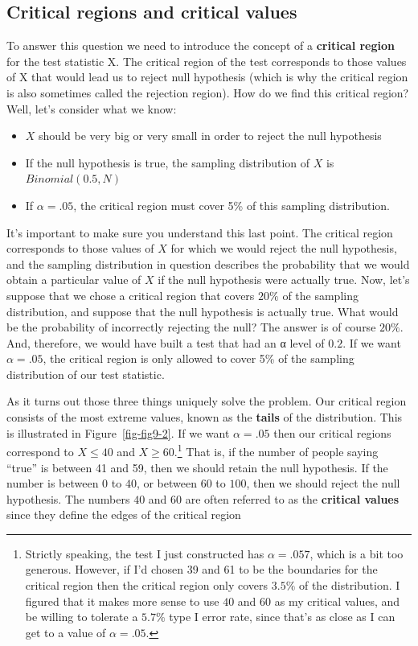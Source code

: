 \documentclass[
  a4paper,
]{book}
\providecommand{\tightlist}{%
  \setlength{\itemsep}{0pt}\setlength{\parskip}{0pt}}\usepackage{longtable,booktabs,array}
\begin{document}
\hypertarget{critical-regions-and-critical-values}{%
\subsection{Critical regions and critical
values}\label{critical-regions-and-critical-values}}

To answer this question we need to introduce the concept of a
\textbf{critical region} for the test statistic X. The critical region
of the test corresponds to those values of X that would lead us to
reject null hypothesis (which is why the critical region is also
sometimes called the rejection region). How do we find this critical
region? Well, let's consider what we know:

\begin{itemize}
\tightlist
\item
  \(X\) should be very big or very small in order to reject the null
  hypothesis
\item
  If the null hypothesis is true, the sampling distribution of \(X\) is
  \(Binomial(0.5, N)\)
\item
  If \(\alpha = .05\), the critical region must cover 5\% of this
  sampling distribution.
\end{itemize}

It's important to make sure you understand this last point. The critical
region corresponds to those values of \(X\) for which we would reject
the null hypothesis, and the sampling distribution in question describes
the probability that we would obtain a particular value of \(X\) if the
null hypothesis were actually true. Now, let's suppose that we chose a
critical region that covers \(20\%\) of the sampling distribution, and
suppose that the null hypothesis is actually true. What would be the
probability of incorrectly rejecting the null? The answer is of course
\(20\%\). And, therefore, we would have built a test that had an α level
of \(0.2\). If we want \(\alpha = .05\), the critical region is only
allowed to cover 5\% of the sampling distribution of our test statistic.

As it turns out those three things uniquely solve the problem. Our
critical region consists of the most extreme values, known as the
\textbf{tails} of the distribution. This is illustrated in
Figure~\ref{fig-fig9-2}. If we want \(\alpha = .05\) then our critical
regions correspond to \(X \leq 40\) and \(X \geq 60\).\footnote{Strictly
  speaking, the test I just constructed has \(\alpha = .057\), which is
  a bit too generous. However, if I'd chosen 39 and 61 to be the
  boundaries for the critical region then the critical region only
  covers \(3.5\%\) of the distribution. I figured that it makes more
  sense to use \(40\) and \(60\) as my critical values, and be willing
  to tolerate a \(5.7\%\) type I error rate, since that's as close as I
  can get to a value of \(\alpha = .05\).} That is, if the number of
people saying ``true'' is between 41 and 59, then we should retain the
null hypothesis. If the number is between \(0\) to \(40\), or between
\(60\) to \(100\), then we should reject the null hypothesis. The
numbers \(40\) and \(60\) are often referred to as the \textbf{critical
values} since they define the edges of the critical region
\end{document}

